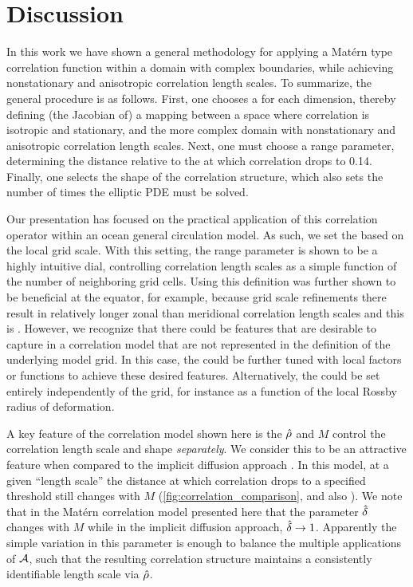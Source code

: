 \section{Discussion}
\label{sec:matern_discussion}

In this work we have shown a general methodology for applying a Mat\'ern type
correlation function within a domain with complex boundaries, while achieving
nonstationary and anisotropic correlation length scales.
To summarize, the general procedure is as follows.
First, one chooses a  for each dimension, thereby
defining (the Jacobian of) a mapping between a space where correlation is
isotropic and stationary, and the more complex domain with nonstationary and
anisotropic correlation length scales.
Next, one must choose a range parameter, determining the distance relative to
the  at which correlation drops to 0.14.
Finally, one selects the shape of the correlation structure, which also sets the
number of times the elliptic PDE must be solved.

Our presentation has focused on the practical application of this
correlation operator within an ocean general circulation model.
As such, we set the  based on the local grid
scale.
With this setting, the range parameter is shown to be a highly intuitive dial,
controlling correlation length scales as a simple function of the number of
neighboring grid cells.
Using this definition was further shown to be beneficial at the equator, for
example, because grid scale refinements there result in relatively
longer zonal than meridional correlation length scales and this is .
However, we recognize that there could be features that are desirable to capture
in a correlation model that are not represented in the definition of the
underlying model grid.
In this case, the  could be further tuned with
local factors or functions to achieve these desired features.
Alternatively, the  could be set entirely independently of
the grid, for instance as a function of the local Rossby radius of deformation.

A key feature of the correlation model shown here is the $\hat{\rho}$ and $M$
control the correlation length scale and shape \textit{separately}.
We consider this to be an attractive feature when compared to the implicit
diffusion approach  \citet{weaver_diffusion_2013}.
In this model, at a given ``length scale'' the distance at which correlation
drops to a specified threshold still changes with $M$
(\cref{fig:correlation_comparison}, and also
\citep[Figs. 1 and 2 of][]{guillet_modelling_2019}).
We note that in the Mat\'ern correlation model presented here that the parameter
$\hat{\delta}$ changes with $M$ while in the implicit diffusion approach, $\hat{\delta}
\rightarrow 1$.
Apparently the simple variation in this parameter is enough to balance the
multiple applications of $\mathcal{A}$, such that the resulting correlation
structure maintains a consistently identifiable length scale via $\hat{\rho}$.

